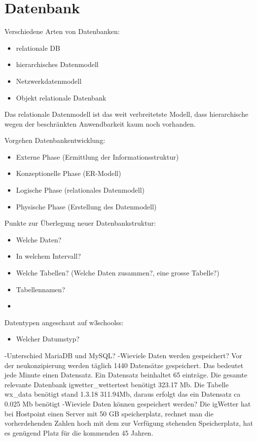 \section{Datenbank}

Verschiedene Arten von Datenbanken:
\begin{itemize}
\item relationale DB
\item hierarchisches Datenmodell
\item Netzwerkdatenmodell
\item Objekt relationale Datenbank
\end{itemize}

Das relationale Datenmodell ist das weit verbreitetste Modell, dass hierarchische wegen der beschränkten Anwendbarkeit kaum noch vorhanden.

Vorgehen Datenbankentwicklung:

\begin{itemize}
\item Externe Phase (Ermittlung der Informationsstruktur)
\item Konzeptionelle Phase (ER-Modell)
\item Logische Phase (relationales Datenmodell)
\item Physische Phase (Erstellung des Datenmodell)
\end{itemize}

Punkte zur Überlegung neuer Datenbankstruktur:
\begin{itemize}
\item Welche Daten?
\item In welchem Intervall?
\item Welche Tabellen? (Welche Daten zusammen?, eine grosse Tabelle?)
\item Tabellennamen?
\item 
\end{itemize}

Datentypen angeschaut auf w3schoolss:
\begin{itemize}
\item Welcher Datumstyp?

\end{itemize}


-Unterschied MariaDB und MySQL?
-Wieviele Daten werden gespeichert?
Vor der neukonzipierung werden täglich 1440 Datensätze gespeichert. Das bedeutet jede Minute einen Datensatz. Ein Datensatz beinhaltet 65 einträge. Die gesamte relevante Datenbank igwetter_wettertest benötigt 323.17  Mb. Die Tabelle wx_data benötigt stand 1.3.18 311.94Mb, daraus erfolgt das ein Datensatz ca 0.025 Mb benötigt 
-Wieviele Daten können gespeichert werden?
Die igWetter hat bei Hostpoint einen Server mit 50 GB speicherplatz, rechnet man die vorherdehenden Zahlen hoch mit dem zur Verfügung stehenden Speicherplatz, hat es genügend Platz für die kommenden 45 Jahren. 

